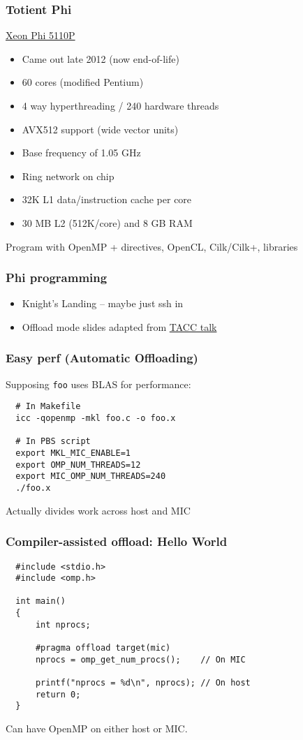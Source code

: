 \documentclass{beamer}
\begin{document}
\begin{frame}
  \frametitle{Totient Phi}

  \href{https://ark.intel.com/products/71992/Intel-Xeon-Phi-Coprocessor-5110P-8GB-1_053-GHz-60-core}{Xeon Phi 5110P}
  \begin{itemize}
  \item Came out late 2012 (now end-of-life)
  \item 60 cores (modified Pentium)
  \item 4 way hyperthreading / 240 hardware threads
  \item AVX512 support (wide vector units)
  \item Base frequency of 1.05 GHz
  \item Ring network on chip
  \item 32K L1 data/instruction cache per core
  \item 30 MB L2 (512K/core) and 8 GB RAM
  \end{itemize}
  Program with OpenMP + directives, OpenCL, Cilk/Cilk+, libraries
\end{frame}


\begin{frame}
  \frametitle{Phi programming}

  \begin{itemize}
  \item Knight's Landing -- maybe just ssh in
  \item Offload mode slides adapted from
    \href{https://portal.tacc.utexas.edu/documents/13601/901837/offload_slides_DJ2013-3.pdf}{TACC
      talk}
  \end{itemize}
\end{frame}

\begin{frame}[fragile]
  \frametitle{Easy perf (Automatic Offloading)}

  Supposing {\tt foo} uses BLAS for performance:
\begin{lstlisting}
  # In Makefile
  icc -qopenmp -mkl foo.c -o foo.x

  # In PBS script
  export MKL_MIC_ENABLE=1
  export OMP_NUM_THREADS=12
  export MIC_OMP_NUM_THREADS=240
  ./foo.x
\end{lstlisting}
  Actually divides work across host and MIC
\end{frame}


\begin{frame}[fragile]
  \frametitle{Compiler-assisted offload: Hello World}

\begin{lstlisting}
  #include <stdio.h>
  #include <omp.h>

  int main()
  {
      int nprocs;

      #pragma offload target(mic)
      nprocs = omp_get_num_procs();    // On MIC

      printf("nprocs = %d\n", nprocs); // On host
      return 0;
  }
\end{lstlisting}
Can have OpenMP on either host or MIC.
\end{frame}
\end{document}
